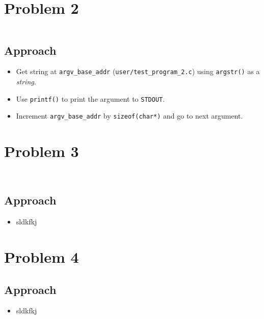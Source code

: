 \documentclass[11pt,a4paper,english]{paper}
\newenvironment{colorboxed}[4][gray]{
\begin{tcolorbox}[colback=#1!3!white,colframe=#1(ryb)!50!black,title=\textbf{#2: #3},#4]
}{
\end{tcolorbox}
}
\begin{document}
\section*{Problem 2}
\begin{colorboxed}{Code}{\texttt{kernel/sysproc.c::\textit{sys\_echo\_kernel()}}}{unbreakable}
    \inputminted[baselinestretch=0.85,firstline=92,lastline=113,breaklines]{c}{kernel/sysproc.c}
\end{colorboxed}
\subsection*{Approach}
\begin{itemize}[noitemsep, nolistsep]
    \item Get string at \texttt{argv\_base\_addr} (\texttt{user/test\_program\_2.c}) using \texttt{argstr()} as a \textit{string}.
    \item Use \texttt{printf()} to print the argument to \texttt{STDOUT}.
    \item Increment \texttt{argv\_base\_addr} by \texttt{sizeof(char*)} and go to next argument.
\end{itemize}
\section*{Problem 3}
\begin{colorboxed}{Code}{\texttt{kernel/sysproc.c::\textit{sys\_trace()}}}{unbreakable}
    \inputminted[baselinestretch=0.85,firstline=115,lastline=122,breaklines]{c}{kernel/sysproc.c}
\end{colorboxed}
\begin{colorboxed}{Code}{\texttt{kernel/syscall.c::\textit{syscall()}}}{unbreakable}
    \inputminted[baselinestretch=0.85,firstline=156,lastline=175,breaklines]{c}{kernel/syscall.c}
\end{colorboxed}
\subsection*{Approach}
\begin{itemize}[noitemsep, nolistsep]
    \item sldkfkj
\end{itemize}
\section*{Problem 4}
\subsection*{Approach}
\begin{itemize}[noitemsep, nolistsep]
    \item sldkfkj
\end{itemize}
\end{document}
